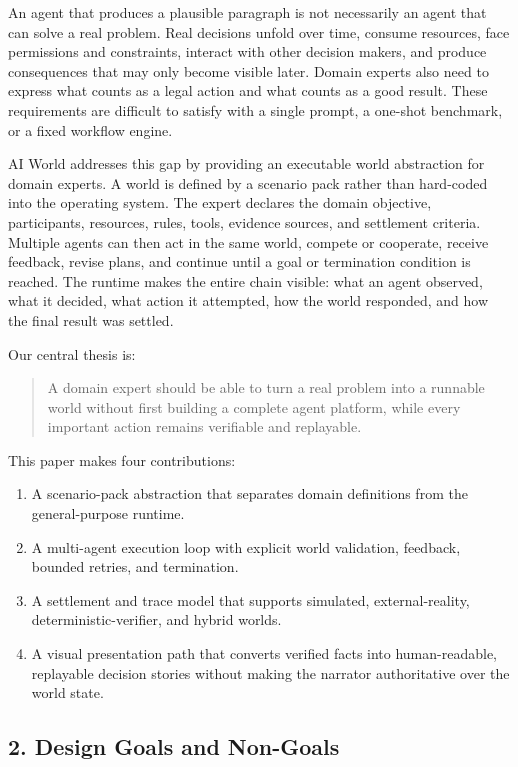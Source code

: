 \documentclass[
]{article}
\providecommand{\tightlist}{%
  \setlength{\itemsep}{0pt}\setlength{\parskip}{0pt}}
\begin{document}
An agent that produces a plausible paragraph is not necessarily an agent
that can solve a real problem. Real decisions unfold over time, consume
resources, face permissions and constraints, interact with other
decision makers, and produce consequences that may only become visible
later. Domain experts also need to express what counts as a legal action
and what counts as a good result. These requirements are difficult to
satisfy with a single prompt, a one-shot benchmark, or a fixed workflow
engine.

AI World addresses this gap by providing an executable world abstraction
for domain experts. A world is defined by a scenario pack rather than
hard-coded into the operating system. The expert declares the domain
objective, participants, resources, rules, tools, evidence sources, and
settlement criteria. Multiple agents can then act in the same world,
compete or cooperate, receive feedback, revise plans, and continue until
a goal or termination condition is reached. The runtime makes the entire
chain visible: what an agent observed, what it decided, what action it
attempted, how the world responded, and how the final result was
settled.

Our central thesis is:

\begin{quote}
A domain expert should be able to turn a real problem into a runnable
world without first building a complete agent platform, while every
important action remains verifiable and replayable.
\end{quote}

This paper makes four contributions:

\begin{enumerate}
\def\labelenumi{\arabic{enumi}.}
\tightlist
\item
  A scenario-pack abstraction that separates domain definitions from the
  general-purpose runtime.
\item
  A multi-agent execution loop with explicit world validation, feedback,
  bounded retries, and termination.
\item
  A settlement and trace model that supports simulated,
  external-reality, deterministic-verifier, and hybrid worlds.
\item
  A visual presentation path that converts verified facts into
  human-readable, replayable decision stories without making the
  narrator authoritative over the world state.
\end{enumerate}

\subsection{2. Design Goals and
Non-Goals}\label{2-design-goals-and-non-goals}
\end{document}
